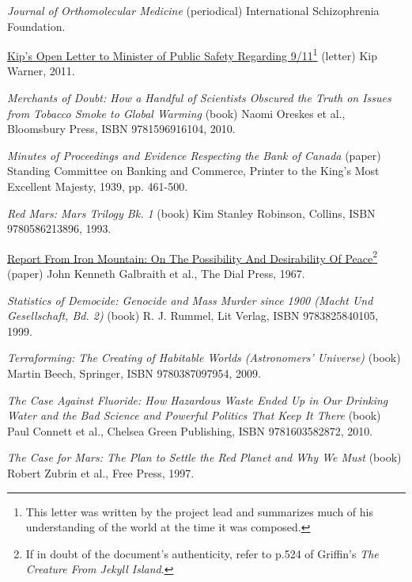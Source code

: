 \item
{\it Journal of Orthomolecular Medicine} (periodical)\crlf
International Schizophrenia Foundation.

\item
\href{http://www.thevertigo.com/html/9-11/}{Kip's Open Letter to Minister of Public Safety Regarding 9/11}\footnote{This letter was written by the project lead and summarizes much of his understanding of the world at the time it was composed.} (letter)\crlf
Kip Warner, 2011.

\item
{\it Merchants of Doubt: How a Handful of Scientists Obscured the Truth on Issues from Tobacco Smoke to Global Warming} (book)\crlf
Naomi Oreskes et al., Bloomsbury Press, ISBN 9781596916104, 2010.

\item
{\it Minutes of Proceedings and Evidence Respecting the Bank of Canada} (paper)\crlf
Standing Committee on Banking and Commerce, Printer to the King's Most Excellent Majesty, 1939, pp. 461-500.

\item
{\it Red Mars: Mars Trilogy Bk. 1} (book)\crlf
Kim Stanley Robinson, Collins, ISBN 9780586213896, 1993.

\item
\href{http://www.teachpeace.com/Report_from_Iron_Mountain.pdf}{Report From Iron Mountain: On The Possibility And Desirability Of Peace}\footnote{If in doubt of the document's authenticity, refer to p.524 of Griffin's {\it The Creature From Jekyll Island}.} (paper)\crlf
John Kenneth Galbraith et al., The Dial Press, 1967.

\item
{\it Statistics of Democide: Genocide and Mass Murder since 1900 (Macht Und Gesellschaft, Bd. 2)} (book)\crlf
R. J. Rummel, Lit Verlag, ISBN 9783825840105, 1999.

\item
{\it Terraforming: The Creating of Habitable Worlds (Astronomers' Universe)} (book)\crlf
Martin Beech, Springer, ISBN 9780387097954, 2009.

\item
{\it The Case Against Fluoride: How Hazardous Waste Ended Up in Our Drinking Water and the Bad Science and Powerful Politics That Keep It There} (book)\crlf
Paul Connett et al., Chelsea Green Publishing, ISBN 9781603582872, 2010.

\item
{\it The Case for Mars: The Plan to Settle the Red Planet and Why We Must} (book)\crlf
Robert Zubrin et al., Free Press, 1997.

